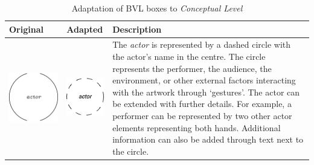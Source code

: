\begin{longtable}{|m{}|m{}|m{}|}
    \caption{Adaptation of BVL boxes to \textit{Conceptual Level}} \label{tab:c4-bvl_conceptual} \\
    \hline
    \textbf{Original} & \textbf{Adapted} & \textbf{Description} \\
    \hline
    \centering
    \includegraphics[width=0.75\linewidth]{chapters/4-MDC_model_application/image/bvl-actor-o.png}
    &
    \centering
    \includegraphics[width=0.75\linewidth]{chapters/4-MDC_model_application/image/bvl-actor.png}
    & 
    The \textit{actor} is represented by a dashed circle with the actor's name in the centre. The circle represents the performer, the audience, the environment, or other external factors interacting with the artwork through ‘gestures’. The actor can be extended with further details. For example, a performer can be represented by two other actor elements representing both hands. Additional information can also be added through text next to the circle. 

\end{longtable}
